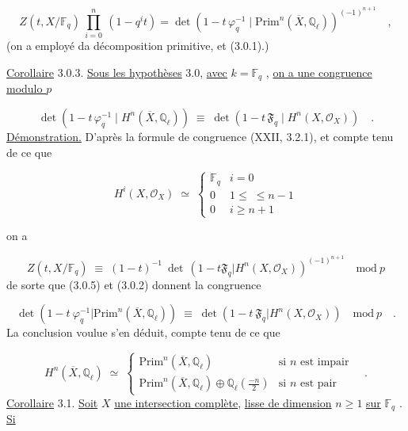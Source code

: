 \begin{equation}\tag{3.0.2}
Z(t,X/\mathbb{F}_q) \ \prod_{i=0}^{n} \ (1-q^i t) = \det(1-t\,\varphi_q^{-1} \mid \mathrm{Prim}^n(\overline{X},\mathbb{Q}_\ell))^{(-1)^{n+1}} \quad ,
\end{equation}
(on a employé da décomposition primitive, et (3.0.1).)

\underline{Corollaire} 3.0.3. \underline{Sous les hypothèses} 3.0, \underline{avec} $k = \mathbb{F}_q$ , \underline{on a une congruence modulo $p$}

\begin{equation*}
\det(1-t\,\varphi_q^{-1} \mid H^n(\overline{X},\mathbb{Q}_\ell)) \;\equiv\; \det(1-t\,\mathfrak{F}_q \mid H^n(X,\mathcal{O}_X)) \quad .
\end{equation*}
\underline{Démonstration.} D'après la formule de congruence (XXII, 3.2.1), et compte tenu de ce que

\begin{equation}\tag{3.0.4}
H^i(X,\mathcal{O}_X) \;\simeq\; \left\{ \begin{array}{ll} \mathbb{F}_q & i = 0 \\[1.5ex] 0 & 1 \leq \; \leq n - 1 \\[1.5ex] 0 & i \geq n+1 \end{array} \right.
\end{equation}

on a

\begin{equation}\tag{3.0.5}
Z(t,X/\mathbb{F}_q) \;\equiv\; (1-t)^{-1}\ \det\,(1-t\mathfrak{F}_q|H^n(X,\mathcal{O}_X))^{(-1)^{n+1}} \quad \mathrm{mod}\ p
\end{equation}
de sorte que (3.0.5) et (3.0.2) donnent la congruence

\begin{equation}\tag{3.0.6}
\det(1-t\ \varphi_q^{-1}|\mathrm{Prim}^n(\overline{X},\mathbb{Q}_\ell)) \;\equiv\; \det(1-t\ \mathfrak{F}_q|H^n(X,\mathcal{O}_X)) \quad \mathrm{mod}\ p \quad .
\end{equation}
La conclusion voulue s'en déduit, compte tenu de ce que

\begin{equation}\tag{3.0.7}
H^n(\overline{X},\mathbb{Q}_\ell) \;\simeq\; \begin{cases} \mathrm{Prim}^n(\overline{X},\mathbb{Q}_\ell) & \text{si } n \text{ est impair} \\[2mm] \mathrm{Prim}^n(\overline{X},\mathbb{Q}_\ell) \oplus \mathbb{Q}_\ell\!\left(\frac{-n}{2}\right) & \text{si } n \text{ est pair} \end{cases} \quad .
\end{equation}
\underline{Corollaire} 3.1. \underline{Soit} $X$ \underline{une intersection complète}, \underline{lisse de dimension} $n \geq 1$ \underline{sur} $\mathbb{F}_q$ . \underline{Si}

